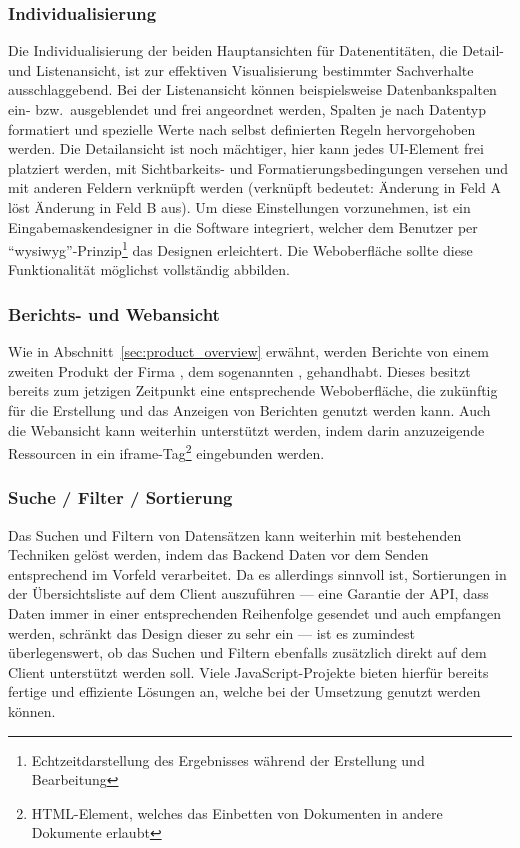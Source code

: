 \subsubsection{Individualisierung}
Die Individualisierung der beiden Hauptansichten für Datenentitäten, die Detail- und Listenansicht, ist zur effektiven Visualisierung bestimmter Sachverhalte ausschlaggebend. Bei der Listenansicht können beispielsweise Datenbankspalten ein- bzw.\ ausgeblendet und frei angeordnet werden, Spalten je nach Datentyp formatiert und spezielle Werte nach selbst definierten Regeln hervorgehoben werden. Die Detailansicht ist noch mächtiger, hier kann jedes UI-Element frei platziert werden, mit Sichtbarkeits- und Formatierungsbedingungen versehen und mit anderen Feldern verknüpft werden (verknüpft bedeutet: Änderung in Feld A löst Änderung in Feld B aus). Um diese Einstellungen vorzunehmen, ist ein Eingabemaskendesigner in die Software integriert, welcher dem Benutzer per ``\gls{wysiwyg}''-Prinzip\footnote{Echtzeitdarstellung des Ergebnisses während der Erstellung und Bearbeitung} das Designen erleichtert.
Die Weboberfläche sollte diese Funktionalität möglichst vollständig abbilden.

\subsubsection{Berichts- und Webansicht}
Wie in Abschnitt~\ref{sec:product_overview} erwähnt, werden Berichte von einem zweiten Produkt der Firma , dem sogenannten , gehandhabt. Dieses besitzt bereits zum jetzigen Zeitpunkt eine entsprechende Weboberfläche, die zukünftig für die Erstellung und das Anzeigen von Berichten genutzt werden kann. 
Auch die Webansicht kann weiterhin unterstützt werden, indem darin anzuzeigende Ressourcen in ein iframe-Tag\footnote{HTML-Element, welches das Einbetten von Dokumenten in andere Dokumente erlaubt} eingebunden werden.

\subsubsection{Suche / Filter / Sortierung}
Das Suchen und Filtern von Datensätzen kann weiterhin mit bestehenden Techniken gelöst werden, indem das Backend Daten vor dem Senden entsprechend im Vorfeld verarbeitet. Da es allerdings sinnvoll ist, Sortierungen in der Übersichtsliste auf dem Client auszuführen --- eine Garantie der API, dass Daten immer in einer entsprechenden Reihenfolge gesendet und auch empfangen werden, schränkt das Design dieser zu sehr ein --- ist es zumindest überlegenswert, ob das Suchen und Filtern ebenfalls zusätzlich direkt auf dem Client unterstützt werden soll. Viele JavaScript-Projekte bieten hierfür bereits fertige und effiziente Lösungen an, welche bei der Umsetzung genutzt werden können.

